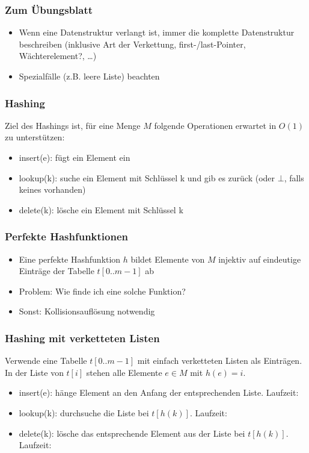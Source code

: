 

\begin{frame}
  \titlepage
\end{frame}

\begin{frame}
\frametitle{Zum Übungsblatt}
\begin{itemize}
\item Wenn eine Datenstruktur verlangt ist, immer die komplette Datenstruktur beschreiben (inklusive Art der Verkettung, first-/last-Pointer, Wächterelement?, \ldots)
\item Spezialfälle (z.B. leere Liste) beachten
\end{itemize}
\end{frame}

\begin{frame}
\frametitle{Hashing}
Ziel des Hashings ist, für eine Menge $M$ folgende Operationen erwartet in $O(1)$ zu unterstützen:
\begin{itemize}
\item insert(e): fügt ein Element ein
\item lookup(k): suche ein Element mit Schlüssel k und gib es zurück (oder $\bot$, falls keines vorhanden)
\item delete(k): lösche ein Element mit Schlüssel k
\end{itemize}
\end{frame}

\begin{frame}
\frametitle{Perfekte Hashfunktionen}
\begin{itemize}
\item Eine perfekte Hashfunktion $h$ bildet Elemente von $M$ injektiv auf eindeutige Einträge der Tabelle $t[0..m-1]$ ab\pause
\item Problem: Wie finde ich eine solche Funktion?\pause
\item Sonst: Kollisionsauflösung notwendig
\end{itemize}
\end{frame}

\begin{frame}
\frametitle{Hashing mit verketteten Listen}
Verwende eine Tabelle $t[0..m-1]$ mit einfach verketteten Listen als Einträgen. In der Liste von $t[i]$ stehen alle Elemente $e\in M$ mit $h(e)=i$.\pause
\begin{itemize}
\item insert(e): hänge Element an den Anfang der entsprechenden Liste. Laufzeit: 
\item lookup(k): durchsuche die Liste bei $t[h(k)]$. Laufzeit: 
\item delete(k): lösche das entsprechende Element aus der Liste bei $t[h(k)]$. Laufzeit: 
\end{itemize}
\end{frame}

